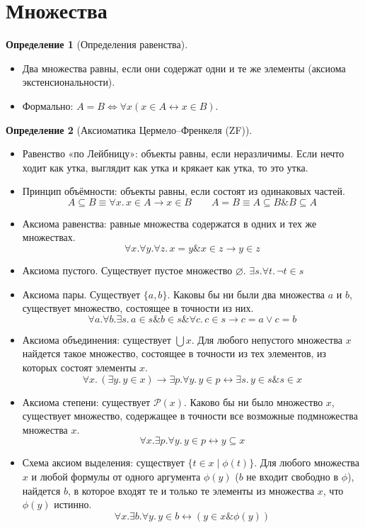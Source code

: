 \documentclass[a4paper,11pt]{article}
\theoremstyle{definition}
\newtheorem*{dfn}{Определение}
\newcommand{\amp}{\mathbin{\&}}
\begin{document}
\section{Множества}
\begin{dfn}[Определения равенства]
\begin{itemize}
\item Два множества равны, если они содержат одни и те же элементы (аксиома
  экстенсиональности).
\item Формально: $A = B \iff \forall x(x \in A \leftrightarrow x \in B)$.
\end{itemize}
\end{dfn}
\begin{dfn}[Аксиоматика Цермело--Френкеля (ZF)]
\begin{itemize}
\item Равенство «по Лейбницу»: объекты равны, если неразличимы. Если нечто ходит
  как утка, выглядит как утка и крякает как утка, то это утка.
\item Принцип объёмности: объекты равны, если состоят из одинаковых частей.
  \[ A \subseteq B \equiv \forall x.\,x \in A \to x \in B \qquad A = B \equiv A \subseteq B \amp B \subseteq A \]
\item Аксиома равенства: равные множества содержатся в одних и тех же
  множествах.
  \[ \forall x.\forall y.\forall z.\,x = y \amp x \in z \to y \in z \]
\item Аксиома пустого. Существует пустое множество $\varnothing$.
  $\exists s.\forall t.\,\neg t \in s$
\item Аксиома пары. Существует $\{a, b\}$. Каковы бы ни были два множества $a$ и
  $b$, существует множество, состоящее в точности из них.
  \[ \forall a.\forall b.\exists s.\,a \in s \amp b \in s \amp \forall c.\,c \in s \to c = a \vee c = b \]
\item Аксиома объединения: существует $\bigcup x$. Для любого непустого
  множества $x$ найдется такое множество, состоящее в точности из тех
  элементов, из которых состоят элементы $x$.
  \[ \forall x.\,(\exists y.\,y \in x) \to \exists p.\forall y.\,y \in p \leftrightarrow \exists s.\,y \in s \amp s \in x \]
\item Аксиома степени: существует $\mathcal{P}(x)$. Каково бы ни было множество
  $x$, существует множество, содержащее в точности все возможные подмножества
  множества $x$.
  \[ \forall x.\exists p.\forall y.\,y \in p \leftrightarrow y \subseteq x \]
\item Схема аксиом выделения: существует $\{t \in x \mid \phi(t)\}$. Для любого
  множества $x$ и любой формулы от одного аргумента $\phi(y)$ ($b$ не входит
  свободно в $\phi$), найдется $b$, в которое входят те и только те элементы из
  множества $x$, что $\phi(y)$ истинно.
  \[ \forall x.\exists b.\forall y.\,y \in b \leftrightarrow (y \in x \amp \phi(y)) \]
\end{itemize}
\end{dfn}
\end{document}

